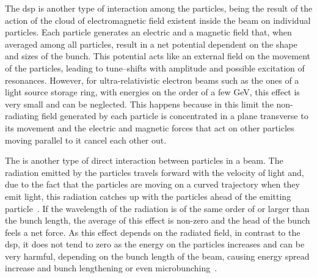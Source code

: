     The \gls{dsp} is another type of interaction among the particles, being the result of the action of the cloud of electromagnetic field existent inside the beam on individual particles. Each particle generates an electric and a magnetic field that, when averaged among all particles, result in a net potential dependent on the shape and sizes of the bunch. This potential acts like an external field on the movement of the particles, leading to tune--shifts with amplitude and possible excitation of resonances. However, for ultra-relativistic electron beams such as the ones of a light source storage ring, with energies on the order of a few \si{\giga\electronvolt}, this effect is very small and can be neglected. This happens because in this limit the non-radiating field generated by each particle is concentrated in a plane transverse to its movement and the electric and magnetic forces that act on other particles moving parallel to it cancel each other out.

    The  is another type of direct interaction between particles in a beam. The radiation emitted by the particles travels forward with the velocity of light and, due to the fact that the particles are moving on a curved trajectory when they emit light, this radiation catches up with the particles ahead of the emitting particle~\cite{Derbenev1995}. If the wavelength of the radiation is of the same order of or larger than the bunch length, the average of this effect is non-zero and the head of the bunch feels a net force. As this effect depends on the radiated field, in contrast to the \gls{dsp}, it does not tend to zero as the energy on the particles increases and can be very harmful, depending on the bunch length of the beam, causing energy spread increase and bunch lengthening or even microbunching~\cite{Byrd2002}.

